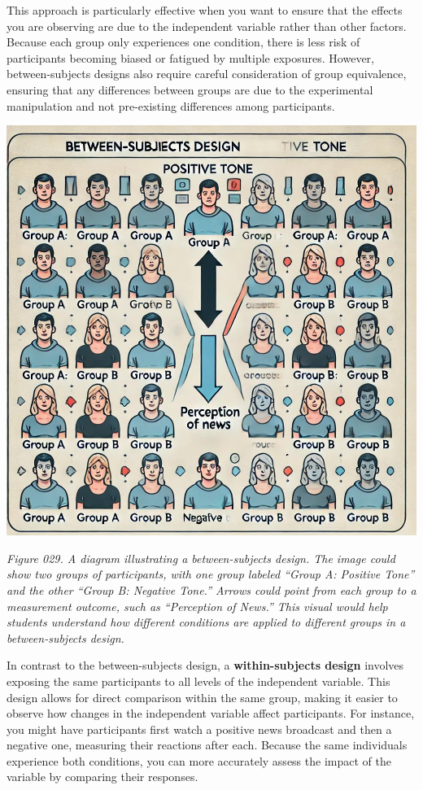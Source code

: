 \documentclass[
]{book}
\begin{document}
This approach is particularly effective when you want to ensure that the effects you are observing are due to the independent variable rather than other factors. Because each group only experiences one condition, there is less risk of participants becoming biased or fatigued by multiple exposures. However, between-subjects designs also require careful consideration of group equivalence, ensuring that any differences between groups are due to the experimental manipulation and not pre-existing differences among participants.

\includegraphics[width=1\textwidth,height=\textheight]{images/fig029.jpg}

\emph{Figure 029. A diagram illustrating a between-subjects design. The image could show two groups of participants, with one group labeled ``Group A: Positive Tone'' and the other ``Group B: Negative Tone.'' Arrows could point from each group to a measurement outcome, such as ``Perception of News.'' This visual would help students understand how different conditions are applied to different groups in a between-subjects design.}

In contrast to the between-subjects design, a \textbf{within-subjects design} involves exposing the same participants to all levels of the independent variable. This design allows for direct comparison within the same group, making it easier to observe how changes in the independent variable affect participants. For instance, you might have participants first watch a positive news broadcast and then a negative one, measuring their reactions after each. Because the same individuals experience both conditions, you can more accurately assess the impact of the variable by comparing their responses.
\end{document}
